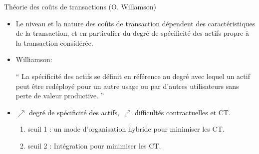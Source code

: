 \begin{frame}[allowframebreaks]{Théorie des coûts de transactions (O. Willamson)}
\begin{itemize}
             \item Le niveau et la nature des coûts de transaction dépendent des 
             caractéristiques de la transaction, et en particulier 
             du degré de spécificité des actifs propre à la transaction considérée.
             \item Williamson: 
             \begin{mdframed}
                “ La spécificité des actifs se définit en référence au degré 
                avec lequel un actif peut être redéployé 
                pour un autre usage ou par d’autres utilisateurs sans perte de valeur productive. ”
             \end{mdframed}
             \item $\nearrow$ degré de spécificité des actifs, $\nearrow$ difficultés contractuelles et CT.
             \begin{enumerate}[$\star$]
                \item seuil 1 : un mode d’organisation hybride pour minimiser les CT.
                \item seuil 2 : Intégration pour minimiser les CT.
             \end{enumerate}
        \end{itemize}



    \end{frame}
